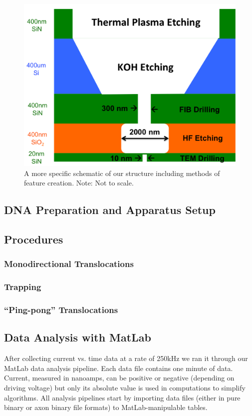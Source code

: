 \documentclass[aps,prl,preprint,groupedaddress]{revtex4}
\begin{document}
\begin{figure}[h]
\centering
\includegraphics[width=.45\textwidth]{figures/structure-schematic}
\caption{A more specific schematic of our structure including methods of feature creation. Note: Not to scale.}
\label{fig:structure-schematic}
\end{figure}

\subsection{DNA Preparation and Apparatus Setup}



\subsection{Procedures}



\subsubsection{Monodirectional Translocations}



\subsubsection{Trapping}



\subsubsection{``Ping-pong'' Translocations}



\subsection{Data Analysis with MatLab}

After collecting current vs. time data at a rate of 250kHz we ran it through our MatLab data analysis pipeline.
Each data file contains one minute of data.
Current, measured in nanoamps, can be positive or negative (depending on driving voltage) but only its absolute value is used in computations to simplify algorithms.
All analysis pipelines start by importing data files (either in pure binary or axon binary file formats) to MatLab-manipulable tables.
\end{document}
